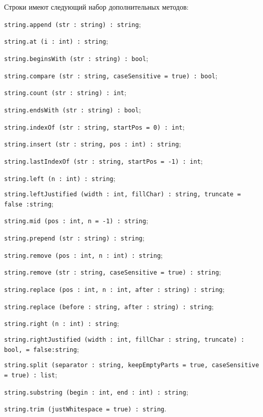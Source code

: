 Строки имеют следующий набор дополнительных методов:
\begin{icItems}
\item
    \texttt{string.append (str : string) : string};
\item
    \texttt{string.at (i : int) : string};
\item
    \texttt{string.beginsWith (str : string) : bool};
\item
    \texttt{string.compare (str : string, caseSensitive = true) : bool};
\item
    \texttt{string.count (str : string) : int};
\item
    \texttt{string.endsWith (str : string) : bool};
\item
    \texttt{string.indexOf (str : string, startPos = 0) : int};
\item
    \texttt{string.insert (str : string, pos : int) : string};
\item
    \texttt{string.lastIndexOf (str : string, startPos = -1) : int};
\item
    \texttt{string.left (n : int) : string};
\item
    \texttt{string.leftJustified (width : int, fillChar) : string, truncate = false :string};
\item
    \texttt{string.mid (pos : int, n = -1) : string};
\item
    \texttt{string.prepend (str : string) : string};
\item
    \texttt{string.remove (pos : int, n : int) : string};
\item
    \texttt{string.remove (str : string, caseSensitive = true) : string};
\item
    \texttt{string.replace (pos : int, n : int, after : string) : string};
\item
    \texttt{string.replace (before : string, after : string) : string};
\item
    \texttt{string.right (n : int) : string};
\item
    \texttt{string.rightJustified (width : int, fillChar : string, truncate) : bool, = false:string};
\item
    \texttt{string.split (separator : string, keepEmptyParts = true, caseSensitive = true) : list};
\item
    \texttt{string.substring (begin : int, end : int) : string};
\item
    \texttt{string.trim (justWhitespace = true) : string}.
\end{icItems}

